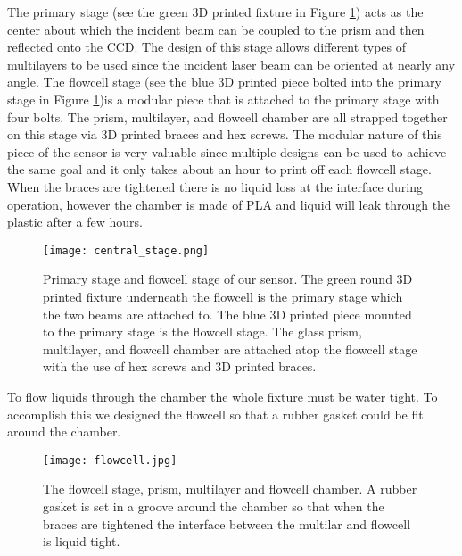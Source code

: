 The primary stage (see the green 3D printed fixture in Figure \ref{fig:centralstage}) acts as the center about which the incident beam can be coupled to the prism and then reflected onto the CCD. The design of this stage allows different types of multilayers to be used since the incident laser beam can be oriented at nearly any angle. The flowcell stage (see the blue 3D printed piece bolted into the primary stage in Figure \ref{fig:centralstage})is a modular piece that is attached to the primary stage with four bolts. The prism, multilayer, and flowcell chamber are all strapped together on this stage via 3D printed braces and hex screws. The modular nature of this piece of the sensor is very valuable since multiple designs can be used to achieve the same goal and it only takes about an hour to print off each flowcell stage. When the braces are tightened there is no liquid loss at the interface during operation, however the chamber is made of PLA and liquid will leak through the plastic after a few hours.

\begin{figure}[h]
\begin{center}
    \texttt{[image: central\_stage.png]}
    \caption{Primary stage and flowcell stage of our sensor. The green round 3D printed fixture underneath the flowcell is the primary stage which the two beams are attached to. The blue 3D printed piece mounted to the primary stage is the flowcell stage. The glass prism, multilayer, and flowcell chamber are attached atop the flowcell stage with the use of hex screws and 3D printed braces.}
    \label{fig:centralstage}
\end{center}
\end{figure}


To flow liquids through the chamber the whole fixture must be water tight. To accomplish this we designed the flowcell so that a rubber gasket could be fit around the chamber.

\begin{figure}
\begin{center}
    \texttt{[image: flowcell.jpg]}
    \caption{The flowcell stage, prism, multilayer and flowcell chamber. A rubber gasket is set in a groove around the chamber so that when the braces are tightened the interface between the multilar and flowcell is liquid tight.}
    \label{fig:flowcellstage}
\end{center}
\end{figure}